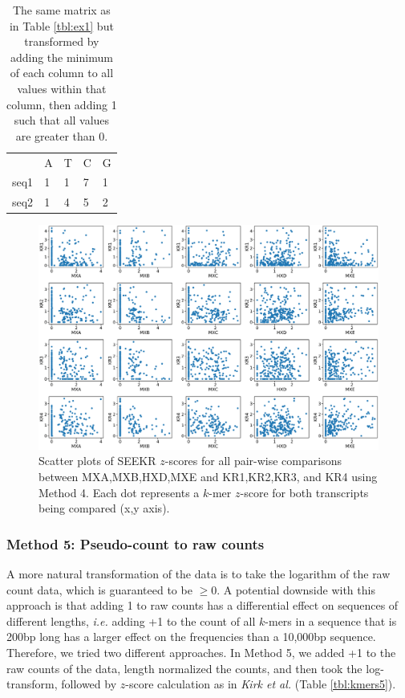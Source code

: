 \begin{table}[h!]
\begin{center}
\begin{tabular}{lllll}
&A & T                   & C                  & G                                                    \\
seq1 & 1 & 1   & 7  & 1 \\
seq2 & 1   & 4 & 5 & 2  
\end{tabular}
\caption{The same matrix as in Table \ref{tbl:ex1} but transformed by adding the minimum of each column to all values within that column, then adding 1 such that all values are greater than 0.}
\label{tbl:ex2}
\end{center}
\end{table}

\begin{figure}[h]
\centering
\includegraphics[width=\textwidth]{images/2_figs.pdf}
\caption{Scatter plots of SEEKR $z$-scores for all pair-wise comparisons between MXA,MXB,HXD,MXE and KR1,KR2,KR3, and KR4 using Method 4. Each dot represents a $k$-mer $z$-score for both transcripts being compared (x,y axis).}
\label{fig:2plots}
\end{figure}

\subsubsection{Method 5: Pseudo-count to raw counts}

A more natural transformation of the data is to take the logarithm of the raw count data, which is guaranteed to be $\geq 0$. A potential downside with this approach is that adding 1 to raw counts has a differential effect on sequences of different lengths, \emph{i.e.} adding +1 to the count of all $k$-mers in a sequence that is 200bp long has a larger effect on the frequencies than a 10,000bp sequence. Therefore, we tried two different approaches. In Method 5, we added +1 to the raw counts of the data, length normalized the counts, and then took the log-transform, followed by $z$-score calculation as in \emph{Kirk et al.} (Table \ref{tbl:kmers5}).

